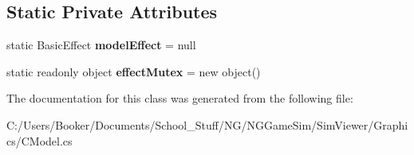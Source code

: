 \subsection*{Static Private Attributes}
\begin{DoxyCompactItemize}
\item 
\mbox{\label{class_n_g_sim_1_1_graphics_1_1_c_model_aaf6727ed8456c44498761f0a688854cd}} 
static Basic\+Effect {\bfseries model\+Effect} = null
\item 
\mbox{\label{class_n_g_sim_1_1_graphics_1_1_c_model_aa19c8f4b03f56f7db1483ff993d613ce}} 
static readonly object {\bfseries effect\+Mutex} = new object()
\end{DoxyCompactItemize}


The documentation for this class was generated from the following file\+:\begin{DoxyCompactItemize}
\item 
C\+:/\+Users/\+Booker/\+Documents/\+School\+\_\+\+Stuff/\+N\+G/\+N\+G\+Game\+Sim/\+Sim\+Viewer/\+Graphics/C\+Model.\+cs\end{DoxyCompactItemize}
